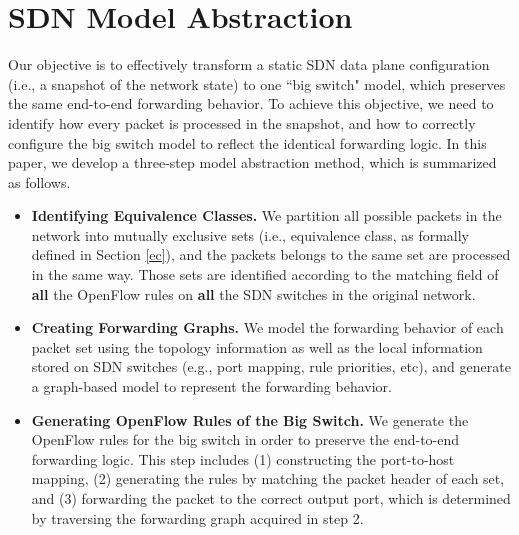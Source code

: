 \section{SDN Model Abstraction}
\label{Sec:Design}

Our objective is to effectively transform a static SDN data plane configuration (i.e., a snapshot of the network state) to one ``big switch" model, which preserves the same end-to-end forwarding behavior. %
To achieve this objective, we need to identify how every packet is processed in the snapshot, and how to correctly configure the big switch model to reflect the identical forwarding logic. In this paper, we develop a three-step model abstraction method, which is summarized as follows.

\begin{itemize}
\item \textbf{Identifying Equivalence Classes.} We partition all possible packets in the network into mutually exclusive sets (i.e., equivalence class, as formally defined in Section \ref{ec}), and the packets belongs to the same set are processed in the same way. Those sets are identified according to the matching field of \textbf{all} the OpenFlow rules on \textbf{all} the SDN switches in the original network.

\item \textbf{Creating Forwarding Graphs.} We model the forwarding behavior of each packet set using the topology information as well as the local information stored on SDN switches (e.g., port mapping, rule priorities, etc), and generate a graph-based model to represent the forwarding behavior.
\item \textbf{Generating OpenFlow Rules of the Big Switch.} We generate the OpenFlow rules for the big switch in order to preserve the end-to-end forwarding logic. This step includes (1) constructing the port-to-host mapping, (2) generating the rules by matching the packet header of each set,  and (3) forwarding the packet to the correct output port, which is determined by traversing the forwarding graph acquired in step 2.
\end{itemize}


